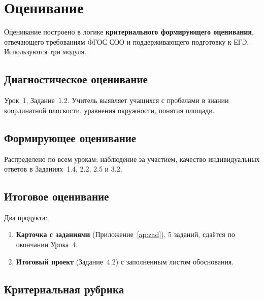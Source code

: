 \documentclass[12pt,a4paper]{scrartcl}
\newcommand{\acc}[1]{\textcolor{accent}{\textbf{#1}}}
\begin{document}
\section{Оценивание}

Оценивание построено в логике \acc{критериального формирующего оценивания}, отвечающего требованиям ФГОС СОО и поддерживающего подготовку к ЕГЭ. Используются три модуля.

\subsection{Диагностическое оценивание}
Урок~1, Задание~1.2. Учитель выявляет учащихся с пробелами в знании координатной плоскости, уравнения окружности, понятия площади.

\subsection{Формирующее оценивание}
Распределено по всем урокам: наблюдение за участием, качество индивидуальных ответов в Заданиях~1.4, 2.2, 2.5 и 3.2.

\subsection{Итоговое оценивание}
Два продукта:
\begin{enumerate}[leftmargin=1.5em,itemsep=0.2em,topsep=0.3em,nosep]
  \item \textbf{Карточка с заданиями} (Приложение~\ref{ap:zad}), 5 заданий, сдаётся по окончании Урока~4.
  \item \textbf{Итоговый проект} (Задание~4.2) с заполненным листом обоснования.
\end{enumerate}

\subsection{Критериальная рубрика}
\end{document}
